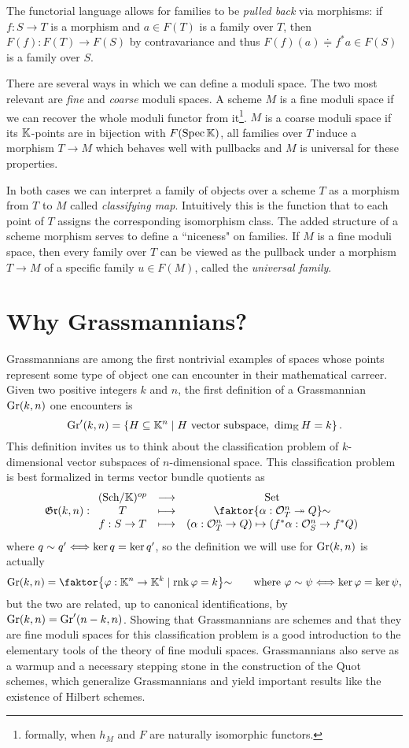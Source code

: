 The functorial language allows for families to be \textit{pulled back} via morphisms: if $f:S\to T$ is a morphism and $a\in F(T)$ is a family over $T$, then $F(f):F(T)\to F(S)$ by contravariance and thus $F(f)(a)\doteqdot f^\ast a\in F(S)$ is a family over $S$.
\medskip

There are several ways in which we can define a moduli space. The two most relevant are \textit{fine} and \textit{coarse} moduli spaces. A scheme $M$ is a fine moduli space if we can recover the whole moduli functor from it\footnote{formally, when $h_M$ and $F$ are naturally isomorphic functors.}. $M$ is a coarse moduli space if its $\mathbb{K}$-points are in bijection with $F(\mathrm{Spec}\, \mathbb{K})$, all families over $T$ induce a morphism $T\to M$ which behaves well with pullbacks and $M$ is universal for these properties.

In both cases we can interpret a family of objects over a scheme $T$ as a morphism from $T$ to $M$ called \textit{classifying map}.  Intuitively this is the function that to each point of $T$ assigns the corresponding isomorphism class. The added structure of a scheme morphism serves to define a ``niceness" on families. If $M$ is a fine moduli space, then every family over $T$ can be viewed as the pullback under a morphism $T\to M$ of a specific family $u\in F(M)$, called the \textit{universal family}.

\section*{Why Grassmannians?}
Grassmannians are among the first nontrivial examples of spaces whose points represent some type of object one can encounter in their mathematical carreer. Given two positive integers $k$ and $n$, the first definition of a Grassmannian $\mathrm{Gr}(k,n)$ one encounters is
\[\mathrm{Gr}'(k,n)=\left\{{H\subseteq\mathbb{K}^n\mid \text{$H$ vector subspace, }\dim_{\mathbb{K}} H=k}\right\}.\]
This definition invites us to think about the classification problem of $k$-dimensional vector subspaces of $n$-dimensional space. This classification problem is best formalized in terms vector bundle quotients as
\[\gr(k,n):\functorDef{(\Sch\K)\op}{\Set}{T}{\quot{\cpa{\al:\Oc_T^n\onto Q}}\sim}{f:S\to T}{(\al:\Oc_T^n\to Q)\mapsto (f^\ast\al:\Oc_S^n\to f^\ast Q)}\]
where $q\sim q'\Longleftrightarrow \ker q=\ker q'$, so the definition we will use for $\mathrm{Gr}(k,n)$ is actually
\[\Gr(k,n)=\quot{\cpa{\vp:\K^n\to \K^k\mid \rnk \vp=k}}\sim\qquad \text{where }\vp\sim \psi\coimplies \ker\vp=\ker\psi,\]
but the two are related, up to canonical identifications, by $\mathrm{Gr}(k,n)=\mathrm{Gr}'(n-k,n)$.
Showing that Grassmannians are schemes and that they are fine moduli spaces for this classification problem is a good introduction to the elementary tools of the theory of fine moduli spaces. Grassmannians also serve as a warmup and a necessary stepping stone in the construction of the Quot schemes, which generalize Grassmannians and yield important results like the existence of Hilbert schemes.